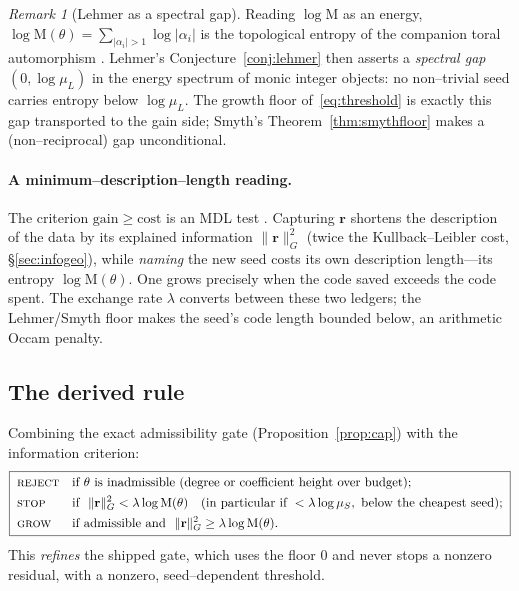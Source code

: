 \documentclass[11pt]{article}
\theoremstyle{plain}
\theoremstyle{definition}
\theoremstyle{remark}
\newtheorem{remark}[theorem]{Remark}
\newcommand{\Mah}{\mathrm{M}}
\newcommand{\rr}{\mathbf{r}}
\newcommand{\GG}{G}
\begin{document}
\begin{remark}[Lehmer as a spectral gap]\label{rem:spectralgap}
Reading $\log\Mah$ as an energy, $\log\Mah(\theta)=\sum_{|\alpha_i|>1}\log|\alpha_i|$ is the topological
entropy of the companion toral automorphism \cite{LSW}. Lehmer's Conjecture~\ref{conj:lehmer} then asserts a
\emph{spectral gap} $(0,\log\mu_L)$ in the energy spectrum of monic integer objects: no non--trivial seed
carries entropy below $\log\mu_L$. The growth floor of~\eqref{eq:threshold} is exactly this gap transported
to the gain side; Smyth's Theorem~\ref{thm:smythfloor} makes a (non--reciprocal) gap unconditional.
\end{remark}

\paragraph{A minimum--description--length reading.} The criterion $\mathrm{gain}\ge\mathrm{cost}$ is an
MDL test \cite{Rissanen}. Capturing $\rr$ shortens the description of the data by its explained information
$\lVert\rr\rVert_{\GG}^2$ (twice the Kullback--Leibler cost, \S\ref{sec:infogeo}), while \emph{naming} the new
seed costs its own description length---its entropy $\log\Mah(\theta)$. One grows precisely when the code
saved exceeds the code spent. The exchange rate $\lambda$ converts between these two ledgers; the
Lehmer/Smyth floor makes the seed's code length bounded below, an arithmetic Occam penalty.

\subsection{The derived rule}
Combining the exact admissibility gate (Proposition~\ref{prop:cap}) with the information criterion:
\begin{equation}\label{eq:threshold}
\boxed{\;
\begin{aligned}
  &\textsc{reject} && \text{if $\theta$ is inadmissible (degree or coefficient height over budget);}\\
  &\textsc{stop}   && \text{if }\ \lVert\rr\rVert_{\GG}^2<\lambda\log\Mah(\theta)
        \quad(\text{in particular if }<\lambda\log\mu_S,\ \text{below the cheapest seed});\\
  &\textsc{grow}   && \text{if admissible and }\ \lVert\rr\rVert_{\GG}^2\ge\lambda\log\Mah(\theta).
\end{aligned}\;}
\end{equation}
This \emph{refines} the shipped gate, which uses the floor $0$ and never stops a nonzero residual, with a
nonzero, seed--dependent threshold.
\end{document}
